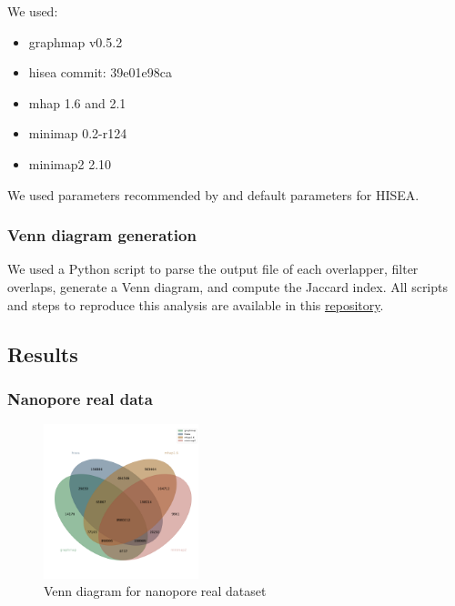 \documentclass[./main.tex]{subfiles}
\begin{document}
We used:

\begin{itemize}
\item graphmap v0.5.2 \cite{graphmap}
\item hisea commit: 39e01e98ca \cite{hisea}
\item mhap 1.6 and 2.1 \cite{Berlin2015}
\item minimap 0.2-r124 \cite{minimap}
\item minimap2 2.10 \cite{minimap2}
\end{itemize}

We used parameters recommended by \citeauthor{ovl_bench} and default parameters for HISEA.

\subsubsection{Venn diagram generation}\label{preassembly:ovl:venn-diagram-generation}

We used a Python script to parse the output file of each overlapper,
filter overlaps, generate a Venn diagram, and compute the Jaccard index.
All scripts and steps to reproduce this analysis are available in this
\href{https://github.com/natir/SOTA-long-read-overlapping-tools-comparative-analysis-data}{repository}.

\subsection{Results}\label{preassembly:ovl:results}

\subsubsection{Nanopore real data}\label{preassembly:ovl:nanopore-real-data}

\begin{figure}[ht]
\centering
\includegraphics[width=0.4\textwidth]{paper/blog_post/nanopore_venn.png}
\caption{Venn diagram for nanopore real dataset}
\end{figure}
\end{document}
